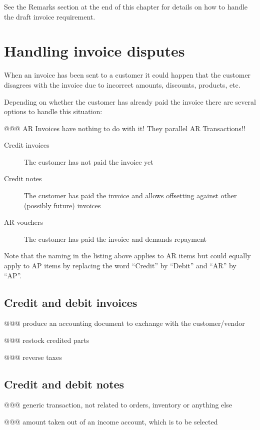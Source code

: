 See the Remarks section at the end of this chapter for details on how to handle
the draft invoice requirement.

\section{Handling invoice disputes}
\label{sec-business-processes-invoicing-handling-disputes}

When an invoice has been sent to a \gls{customer} it could happen that the customer disagrees
with the invoice due to incorrect amounts, discounts, products, etc.

Depending on whether the customer has already paid the invoice there are several
options to handle this situation:

@@@ AR Invoices have nothing to do with it! They parallel AR Transactions!!

\begin{description}
\item [Credit invoices] The \gls{customer} has not paid the invoice yet
\item [Credit notes] The customer has paid the invoice and allows offsetting against
   other (possibly future) invoices
\item[AR vouchers] The customer has paid the invoice and demands repayment
\end{description}

Note that the naming in the listing above applies to AR items but could equally apply
to AP items by replacing the word ``Credit'' by ``Debit'' and ``AR'' by ``AP''.



\subsection{Credit and debit invoices}

@@@ produce an accounting document to exchange with the customer/vendor

@@@ restock credited parts

@@@ reverse taxes

\subsection{Credit and debit notes}

@@@ generic transaction, not related to orders, inventory or anything else

@@@ amount taken out of an income account, which is to be selected

